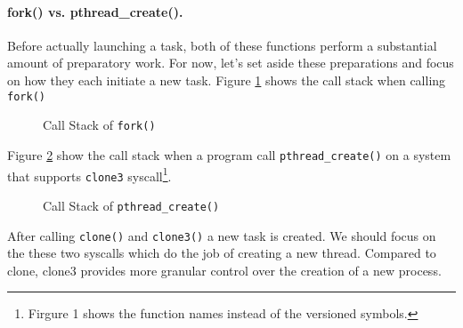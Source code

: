 \paragraph{fork() vs. pthread\_create().} Before actually launching a task, both of these functions perform a substantial amount of preparatory work. For now, let's set aside these preparations and focus on how they each initiate a new task. Figure \ref{fig:fork-callstack} shows the call stack when calling \texttt{fork()}
\begin{figure}[htbp]
    \centering
    \caption{Call Stack of \texttt{fork()}}
    \label{fig:fork-callstack}
\end{figure}
Figure \ref{fig:pthread-callstack} show the call stack when a program call \texttt{pthread\_create()} on a system that supports \texttt{clone3} syscall\footnote{Firgure 1 shows the function names instead of the versioned symbols.}.
% 
\begin{figure}[htbp]
    \centering
    \caption{Call Stack of \texttt{pthread\_create()}}
    \label{fig:pthread-callstack}
\end{figure}
After calling \texttt{clone()} and \texttt{clone3()} a new task is created.
We should focus on the these two syscalls which do the job of creating a new thread. 
% 
Compared to clone, clone3 provides more granular control over the creation of a new process.

